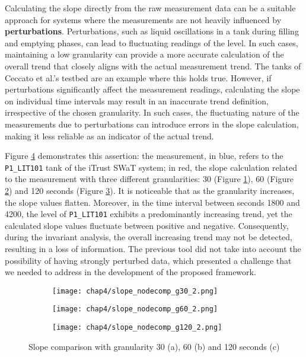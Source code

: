 \bigskip
Calculating the slope directly from the raw measurement data can be a suitable approach for systems where the measurements are not heavily influenced by \textbf{perturbations}. Perturbations, such as liquid oscillations in a tank during filling and emptying phases, can lead to fluctuating readings of the level. In such cases, maintaining a low granularity can provide a more accurate calculation of the overall trend that closely aligns with the actual measurement trend. The tanks of Ceccato et al.'s testbed are an example where this holds true.\newline
However, if perturbations significantly affect the measurement readings, calculating the slope on individual time intervals may result in an inaccurate trend definition, irrespective of the chosen granularity. In such cases, the fluctuating nature of the measurements due to perturbations can introduce errors in the slope calculation, making it less reliable as an indicator of the actual trend.

\bigskip
Figure \ref{fig:4_slope_comparison} demonstrates this assertion: the measurement, in blue, refers to the \texttt{P1\_LIT101} tank of the iTrust SWaT system; in red, the slope calculation related to the measurement with three different granularities: 30 (Figure \ref{subfig:4_slope_g30_nodecomp}), 60 (Figure \ref{subfig:4_slope_g60_nodecomp}) and 120 seconds (Figure \ref{subfig:4_slope_g120_nodecomp}). It is noticeable that as the granularity increases, the slope values flatten. Moreover, in the time interval between seconds 1800 and 4200, the level of \texttt{P1\_LIT101} exhibits a predominantly increasing trend, yet the calculated slope values fluctuate between positive and negative. Consequently, during the invariant analysis, the overall increasing trend may not be detected, resulting in a loss of information.\newline \newline
The previous tool did not take into account the possibility of having strongly perturbed data, which presented a challenge that we needed to address in the development of the proposed framework.
\vfill
\pagebreak

\begin{figure}[H]
	\centering
	\begin{subfigure}{0.9\textwidth}
		\texttt{[image: chap4/slope\_nodecomp\_g30\_2.png]}
		\caption{}
		\label{subfig:4_slope_g30_nodecomp}
	\end{subfigure}
	\hfill
	\begin{subfigure}{0.9\textwidth}
		\texttt{[image: chap4/slope\_nodecomp\_g60\_2.png]}
		\caption{}
		\label{subfig:4_slope_g60_nodecomp}
	\end{subfigure}
	\begin{subfigure}{0.9\textwidth}
		\texttt{[image: chap4/slope\_nodecomp\_g120\_2.png]}
		\caption{}
		\label{subfig:4_slope_g120_nodecomp}
	\end{subfigure}
	\caption{Slope comparison with granularity 30 (a), 60 (b) and 120 seconds (c)}
	\label{fig:4_slope_comparison}
\end{figure}

